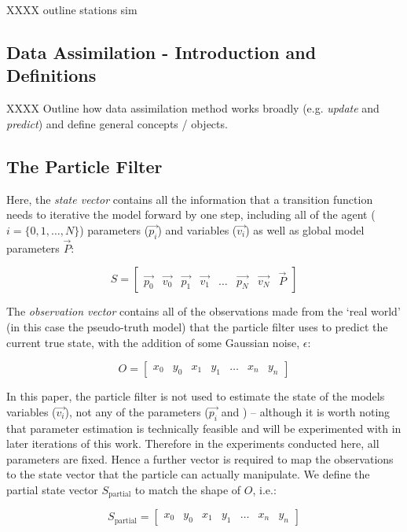 XXXX outline stations sim


\subsection{Data Assimilation - Introduction and Definitions}

XXXX Outline how data assimilation method works broadly (e.g. \textit{update} and \textit{predict}) and define general concepts / objects.


\subsection{The Particle Filter}

Here, the \textit{state vector} contains all the information that a transition function needs to iterative the model forward by one step, including all of the agent ($i = \{ 0, 1, \dots, N \} $) parameters ($\overrightarrow{p_i}$) and variables ($\overrightarrow{v_i}$) as well as global model parameters $\overrightarrow{P}$:

\begin{equation}
  S  = \left[ \begin{array}{cccccccc}
\overrightarrow{p_0} & \overrightarrow{v_0} & \overrightarrow{p_1} &  \overrightarrow{v_1} &  \dots &  \overrightarrow{p_N} &  \overrightarrow{v_N} & \overrightarrow{P} 
\end{array} \right]
\end{equation} 

The \textit{observation vector} contains all of the observations made from the `real world' (in this case the pseudo-truth model) that the particle filter uses to predict the current true state, with the addition of some Gaussian noise, $\epsilon$:

\begin{equation}
  O  = \left[ \begin{array}{ccccccc}
x_0 & y_0 & x_1 & y_1 & \dots & x_n & y_n 
\end{array} \right]
\end{equation} 

In this paper, the particle filter is not used to estimate the state of the models variables ($\overrightarrow{v_i}$), not any of the parameters ($\overrightarrow{p_i}$ and ) -- although it is worth noting that parameter estimation is technically feasible and will be experimented with in later iterations of this work. Therefore in the experiments conducted here, all parameters are fixed. Hence a further vector is required to map the observations to the state vector that the particle can actually manipulate. We define the partial state vector $S_\textrm{partial}$ to match the shape of $O$, i.e.:

\begin{equation}
  S_\textrm{partial}  = \left[ \begin{array}{ccccccc}
x_0 & y_0 & x_1 & y_1 & \dots & x_n & y_n 
\end{array} \right]
\end{equation} 

